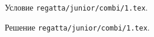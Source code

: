 Условие \texttt{regatta/junior/combi/1.tex}.

\solution Решение \texttt{regatta/junior/combi/1.tex}.
